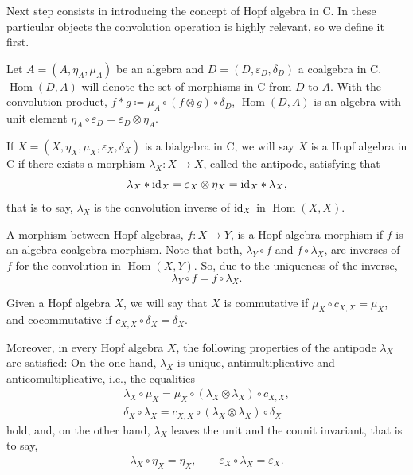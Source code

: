 \documentclass[pdftex]{sigma}
\numberwithin{equation}{section}
\newcommand{\ot}{\otimes}
\newcommand{\co}{\circ}
\DeclareMathOperator{\Hom}{Hom}
\begin{document}
Next step consists in introducing the concept of Hopf algebra in {\sf C}. In these particular objects the convolution operation is highly relevant, so we define it first.
\begin{Definition}
Let $A=(A,\eta_{A},\mu_{A})$ be an algebra and $D=(D,\varepsilon_{D},\delta_{D})$ a coalgebra in {\sf C}. $\Hom(D,A)$ will denote the set of morphisms in {\sf C} from $D$ to $A$. With the convolution product, $f\ast g\coloneqq\mu_{A}\circ(f\otimes g)\circ\delta_{D}$, $\Hom(D,A)$ is an algebra with unit element $\eta_{A}\circ\varepsilon_{D}=\varepsilon_{D}\otimes\eta_{A}$.
\end{Definition}
\begin{Definition}
If $X=(X,\eta_{X},\mu_{X},\varepsilon_{X},\delta_{X})$ is a bialgebra in {\sf C}, we will say $X$ is a Hopf algebra in {\sf C} if there exists a morphism $\lambda_{X}\colon X\rightarrow X$, called the antipode, satisfying that
\begin{equation}\label{antipode}
\lambda_{X}\ast {\rm id}_{X}=\varepsilon_{X}\otimes\eta_{X}={\rm id}_{X}\ast\lambda_{X},
\end{equation}
that is to say, $\lambda_{X}$ is the convolution inverse of ${\rm id}_{X}$ in $\Hom(X,X)$.

A morphism between Hopf algebras, $f\colon X\rightarrow Y$, is a Hopf algebra morphism if $f$ is an algebra-coalgebra morphism. Note that both, $\lambda_{Y}\circ f$ and $f\circ\lambda_{X}$, are inverses of $f$ for the convolution in $\Hom(X,Y)$. So, due to the uniqueness of the inverse,
\begin{equation}\label{morant}
\lambda_{Y}\circ f=f\circ\lambda_{X}.
\end{equation}

Given a Hopf algebra $X$, we will say that $X$ is commutative if $\mu_{X}\circ c_{X,X}=\mu_{X}$, and cocommutative if $c_{X,X}\circ\delta_{X}=\delta_{X}$.

Moreover, in every Hopf algebra $X$, the following properties of the antipode $\lambda_{X}$ are satisfied: On the one hand, $\lambda_{X}$ is unique, antimultiplicative and anticomultiplicative, i.e., the equalities
\begin{gather}
\lambda_{X}\co \mu_{X}= \mu_{X}\co (\lambda_{X}\ot \lambda_{X})\co c_{X,X},\nonumber
\\
\label{a-antip2}\delta_{X}\co \lambda_{X}=c_{X,X}\co (\lambda_{X}\ot \lambda_{X})\co \delta_{X}
\end{gather}
hold, and, on the other hand, $\lambda_{X}$ leaves the unit and the counit invariant, that is to say,
\begin{gather}
\lambda_{X}\co \eta_{X}= \eta_{X},\qquad
\label{u-antip2}\varepsilon_{X}\co \lambda_{X}=\varepsilon_{X}.
\end{gather}


\end{Definition}
\end{document}
